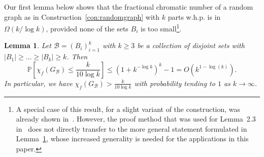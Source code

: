 \documentclass[a4paper,10pt]{amsart}
\newtheorem{lemma}[theorem]{Lemma}
\begin{document}
Our first lemma below shows that the fractional chromatic number of a random graph as in Construction~\ref{con:randomgraph} with $k$ parts w.h.p. is in $\Omega(k/\log k)$, provided none of the sets $B_i$ is too small\footnote{A special case of this result, for a slight variant of the construction, was already shown in~\cite[Lemma 2.3]{janzer}. However, the proof method that was used for Lemma~2.3 in~\cite{janzer} does not directly transfer to the more general statement formulated in Lemma~\ref{lem:fracchrom}, whose increased generality is needed for the applications in this paper.}. 

\begin{lemma}\label{lem:fracchrom}
Let $\mathcal{B}=(B_i)_{i=1}^{k}$ with $k\ge 3$ be a collection of disjoint sets with $|B_1|\ge \dots\ge |B_k|\ge k$. Then
$$\mathbb{P}\left[\chi_f(G_{\mathcal{B}})\le \frac{k}{10\log k}\right] \le \left(1+k^{-\log k}\right)^k-1=O(k^{1-\log(k)}).$$ In particular, we have $\chi_f(G_{\mathcal{B}})> \frac{k}{10\log k}$ with probability tending to $1$ as $k\rightarrow \infty$.
\end{lemma}
\end{document}
